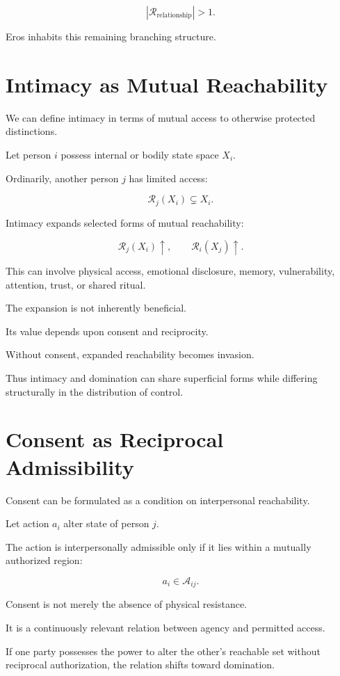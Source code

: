 \documentclass[11pt,oneside]{book}
\theoremstyle{definition}
\theoremstyle{remark}
\newcommand{\A}{\mathcal{A}}
\newcommand{\R}{\mathcal{R}}
\begin{document}
\[
|\R_{\mathrm{relationship}}|>1.
\]

Eros inhabits this remaining branching structure.

\section{Intimacy as Mutual Reachability}

We can define intimacy in terms of mutual access to otherwise protected distinctions.

Let person \(i\) possess internal or bodily state space \(X_i\).

Ordinarily, another person \(j\) has limited access:

\[
\R_j(X_i)
\subsetneq
X_i.
\]

Intimacy expands selected forms of mutual reachability:

\[
\R_j(X_i)\uparrow,
\qquad
\R_i(X_j)\uparrow.
\]

This can involve physical access, emotional disclosure, memory, vulnerability, attention, trust, or shared ritual.

The expansion is not inherently beneficial.

Its value depends upon consent and reciprocity.

Without consent, expanded reachability becomes invasion.

Thus intimacy and domination can share superficial forms while differing structurally in the distribution of control.

\section{Consent as Reciprocal Admissibility}

Consent can be formulated as a condition on interpersonal reachability.

Let action \(a_i\) alter state of person \(j\).

The action is interpersonally admissible only if it lies within a mutually authorized region:

\[
a_i
\in
\A_{ij}.
\]

Consent is not merely the absence of physical resistance.

It is a continuously relevant relation between agency and permitted access.

If one party possesses the power to alter the other's reachable set without reciprocal authorization, the relation shifts toward domination.
\end{document}
